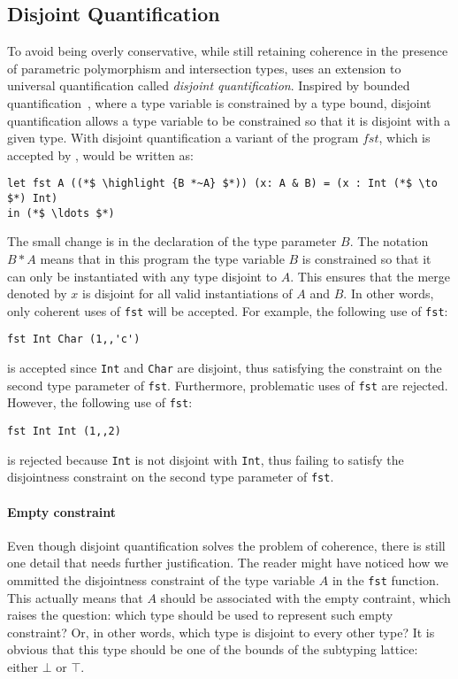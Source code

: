\subsection{Disjoint Quantification}
To avoid being overly conservative, while still retaining coherence in the
presence of parametric polymorphism and intersection types, \name uses
an extension to universal quantification called \emph{disjoint quantification}.
Inspired by bounded quantification~\cite{Cardelli:1994},
where a type variable is constrained by a type bound, disjoint quantification 
allows a type variable to be constrained so that it is disjoint with a given type. 
With disjoint quantification a variant of the program $fst$, which
is accepted by \name, would be written as:
\begin{lstlisting}
let fst A ((*$ \highlight {B *~A} $*)) (x: A & B) = (x : Int (*$ \to $*) Int)
in (*$ \ldots $*)
\end{lstlisting}
The small change is in the declaration of the type parameter $B$. The notation
$B*A$ means that in this program the type variable $B$ is constrained so that
it can only be instantiated with any type disjoint to $A$.
This ensures that the
merge denoted by $x$ is disjoint for all valid instantiations of $A$ and $B$.
In other words, only coherent uses of \lstinline$fst$ will be accepted.
For example, the following use of \lstinline$fst$:
\begin{lstlisting}
fst Int Char (1,,'c')
\end{lstlisting}
is accepted since \lstinline$Int$ and \lstinline$Char$ are disjoint, thus satisfying the constraint
on the second type parameter of \lstinline$fst$.
Furthermore, problematic uses of \lstinline$fst$ are rejected. 
However, the following use of \lstinline$fst$:
\begin{lstlisting}
fst Int Int (1,,2)
\end{lstlisting}
is rejected because \lstinline$Int$ is not disjoint with \lstinline$Int$, thus failing to satisfy the
disjointness constraint on the second type parameter of \lstinline$fst$.

\paragraph{Empty constraint}
Even though disjoint quantification solves the problem of coherence, there is still one detail 
that needs further justification.
The reader might have noticed how we ommitted the disjointness constraint of 
the type variable $A$ in the \lstinline$fst$ function.
This actually means that $A$ should be associated with the empty contraint,
which raises the question: which type should be used to represent such empty constraint?
Or, in other words, which type is disjoint to every other type? 
It is obvious that this type should be one of the bounds of the subtyping lattice: either $\bot$ or
$\top$.

